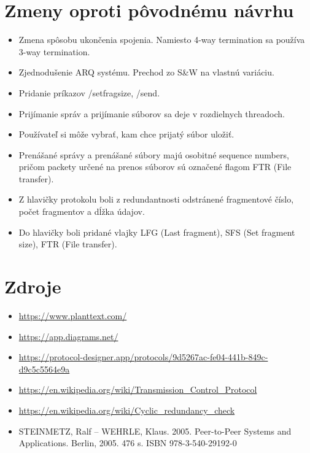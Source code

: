 \documentclass[a4paper,12pt]{article}
\begin{document}
\section{Zmeny oproti pôvodnému návrhu}
	\begin{itemize}
	    \item Zmena spôsobu ukončenia spojenia. Namiesto 4-way termination sa používa 3-way termination.
	    \item Zjednodušenie ARQ systému. Prechod zo S\&W na vlastnú variáciu.
	    \item Pridanie príkazov /setfragsize, /send.
	    \item Prijímanie správ a prijímanie súborov sa deje v rozdielnych threadoch.
	    \item Používateľ si môže vybrať, kam chce prijatý súbor uložiť.
	    \item Prenášané správy a prenášané súbory majú osobitné sequence numbers, pričom packety určené na prenos súborov sú označené flagom FTR (File transfer).
	    \item Z hlavičky protokolu boli z redundantnosti odstránené fragmentové číslo, počet fragmentov a dĺžka údajov.
            \item Do hlavičky boli pridané vlajky LFG (Last fragment), SFS (Set fragment size), FTR (File transfer).
	\end{itemize}

\section{Zdroje}
	\begin{itemize}
	    \item \url{https://www.planttext.com/}
	    \item \url{https://app.diagrams.net/}
	    \item \url{https://protocol-designer.app/protocols/9d5267ac-fe04-441b-849c-d9c5c5564e9a}
	    \item \url{https://en.wikipedia.org/wiki/Transmission_Control_Protocol}
	    \item \url{https://en.wikipedia.org/wiki/Cyclic_redundancy_check}
	    \item STEINMETZ, Ralf – WEHRLE, Klaus. 2005. Peer-to-Peer Systems and Applications. Berlin, 2005. 476 s. ISBN 978-3-540-29192-0
	\end{itemize}
\end{document}
